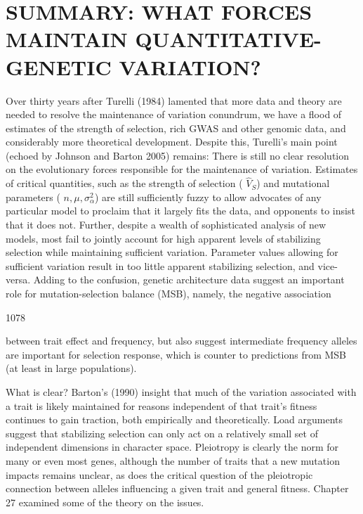\documentclass{article}
\begin{document}
\section{SUMMARY: WHAT FORCES MAINTAIN QUANTITATIVE-GENETIC VARIATION?}
Over thirty years after Turelli (1984) lamented that more data and theory are needed to resolve the maintenance of variation conundrum, we have a flood of estimates of the strength of selection, rich GWAS and other genomic data, and considerably more theoretical development. Despite this, Turelli's main point (echoed by Johnson and Barton 2005) remains: There is still no clear resolution on the evolutionary forces responsible for the maintenance of variation. Estimates of critical quantities, such as the strength of selection ( $ \widehat{V}_{S} $) and mutational parameters ( $ n, \mu, \sigma_{\alpha}^{2} $) are still sufficiently fuzzy to allow advocates of any particular model to proclaim that it largely fits the data, and opponents to insist that it does not. Further, despite a wealth of sophisticated analysis of new models, most fail to jointly account for high apparent levels of stabilizing selection while maintaining sufficient variation. Parameter values allowing for sufficient variation result in too little apparent stabilizing selection, and vice-versa. Adding to the confusion, genetic architecture data suggest an important role for mutation-selection balance (MSB), namely, the negative association

1078

between trait effect and frequency, but also suggest intermediate frequency alleles are important for selection response, which is counter to predictions from MSB (at least in large populations).

What is clear? Barton’s (1990) insight that much of the variation associated with a trait is likely maintained for reasons independent of that trait’s fitness continues to gain traction, both empirically and theoretically. Load arguments suggest that stabilizing selection can only act on a relatively small set of independent dimensions in character space. Pleiotropy is clearly the norm for many or even most genes, although the number of traits that a new mutation impacts remains unclear, as does the critical question of the pleiotropic connection between alleles influencing a given trait and general fitness. Chapter 27 examined some of the theory on the issues.
\end{document}
